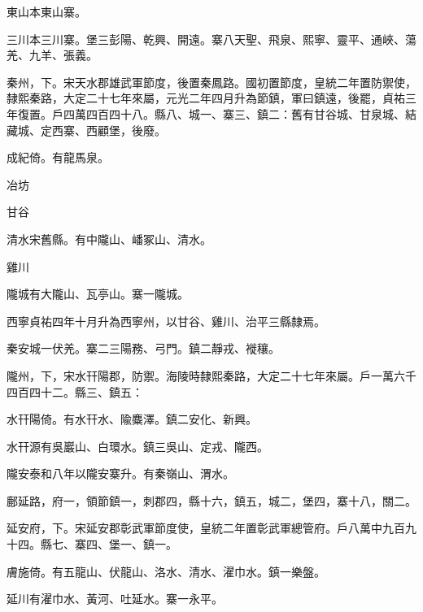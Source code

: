 \begin{pinyinscope}
 東山本東山寨。



 三川本三川寨。堡三彭陽、乾興、開遠。寨八天聖、飛泉、熙寧、靈平、通峽、蕩羌、九羊、張義。



 秦州，下。宋天水郡雄武軍節度，後置秦鳳路。國初置節度，皇統二年置防禦使，隸熙秦路，大定二十七年來屬，元光二年四月升為節鎮，軍曰鎮遠，後罷，貞祐三年復置。戶四萬四百四十八。縣八、城一、寨三、鎮二：舊有甘谷城、甘泉城、結藏城、定西寨、西顧堡，後廢。



 成紀倚。有龍馬泉。



 冶坊



 甘谷



 清水宋舊縣。有中隴山、嶓冢山、清水。



 雞川



 隴城有大隴山、瓦亭山。寨一隴城。



 西寧貞祐四年十月升為西寧州，以甘谷、雞川、治平三縣隸焉。



 秦安城一伏羌。寨二三陽務、弓門。鎮二靜戎、褷穰。



 隴州，下，宋水幵陽郡，防禦。海陵時隸熙秦路，大定二十七年來屬。戶一萬六千四百四十二。縣三、鎮五：



 水幵陽倚。有水幵水、隃麋澤。鎮二安化、新興。



 水幵源有吳巖山、白環水。鎮三吳山、定戎、隴西。



 隴安泰和八年以隴安寨升。有秦嶺山、渭水。



 鄜延路，府一，領節鎮一，刺郡四，縣十六，鎮五，城二，堡四，寨十八，關二。



 延安府，下。宋延安郡彰武軍節度使，皇統二年置彰武軍總管府。戶八萬中九百九十四。縣七、寨四、堡一、鎮一。



 膚施倚。有五龍山、伏龍山、洛水、清水、濯巾水。鎮一樂盤。



 延川有濯巾水、黃河、吐延水。寨一永平。




\end{pinyinscope}
